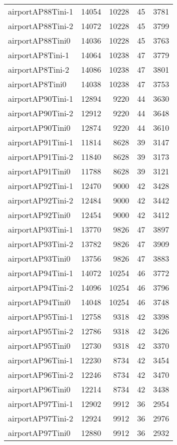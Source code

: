 \begin{longtable}{lrrrr}
airportAP88Tini-1 & 14054 & 10228 & 45 & 3781 \\
airportAP88Tini-2 & 14072 & 10228 & 45 & 3799 \\
airportAP88Tini0 & 14036 & 10228 & 45 & 3763 \\
airportAP8Tini-1 & 14064 & 10238 & 47 & 3779 \\
airportAP8Tini-2 & 14086 & 10238 & 47 & 3801 \\
airportAP8Tini0 & 14038 & 10238 & 47 & 3753 \\
airportAP90Tini-1 & 12894 & 9220 & 44 & 3630 \\
airportAP90Tini-2 & 12912 & 9220 & 44 & 3648 \\
airportAP90Tini0 & 12874 & 9220 & 44 & 3610 \\
airportAP91Tini-1 & 11814 & 8628 & 39 & 3147 \\
airportAP91Tini-2 & 11840 & 8628 & 39 & 3173 \\
airportAP91Tini0 & 11788 & 8628 & 39 & 3121 \\
airportAP92Tini-1 & 12470 & 9000 & 42 & 3428 \\
airportAP92Tini-2 & 12484 & 9000 & 42 & 3442 \\
airportAP92Tini0 & 12454 & 9000 & 42 & 3412 \\
airportAP93Tini-1 & 13770 & 9826 & 47 & 3897 \\
airportAP93Tini-2 & 13782 & 9826 & 47 & 3909 \\
airportAP93Tini0 & 13756 & 9826 & 47 & 3883 \\
airportAP94Tini-1 & 14072 & 10254 & 46 & 3772 \\
airportAP94Tini-2 & 14096 & 10254 & 46 & 3796 \\
airportAP94Tini0 & 14048 & 10254 & 46 & 3748 \\
airportAP95Tini-1 & 12758 & 9318 & 42 & 3398 \\
airportAP95Tini-2 & 12786 & 9318 & 42 & 3426 \\
airportAP95Tini0 & 12730 & 9318 & 42 & 3370 \\
airportAP96Tini-1 & 12230 & 8734 & 42 & 3454 \\
airportAP96Tini-2 & 12246 & 8734 & 42 & 3470 \\
airportAP96Tini0 & 12214 & 8734 & 42 & 3438 \\
airportAP97Tini-1 & 12902 & 9912 & 36 & 2954 \\
airportAP97Tini-2 & 12924 & 9912 & 36 & 2976 \\
airportAP97Tini0 & 12880 & 9912 & 36 & 2932 \\

\end{longtable}
